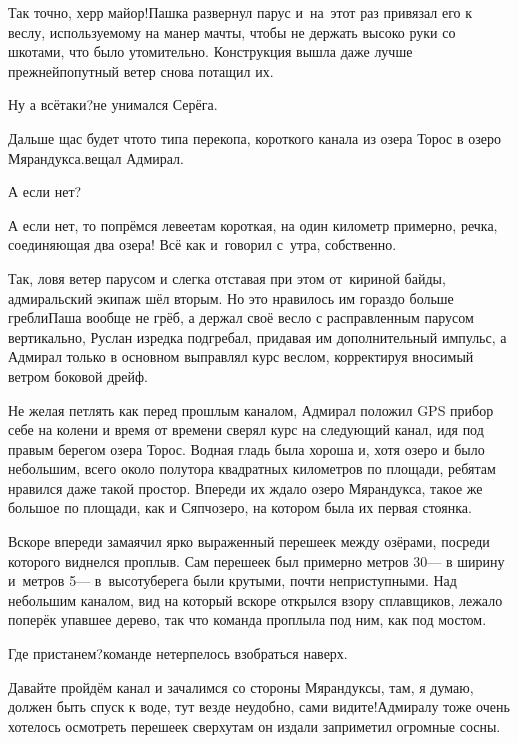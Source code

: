 \diagdash Так точно, херр майор!\mdash Пашка развернул парус и~на~этот раз привязал его к веслу, используемому на манер мачты, чтобы не держать высоко руки со шкотами, что было утомительно. Конструкция вышла даже лучше прежней\mdash попутный ветер снова потащил их. 

\diagdash Ну а всё\sdash таки?\mdash не унимался Серёга.

\diagdash Дальше щас будет что\sdash то типа перекопа, короткого канала из озера Торос в озеро Мярандукса.\mdash вещал Адмирал.

\diagdash А если нет?

\diagdash А если нет, то попрёмся левее\mdash там короткая, на один километр примерно, речка, соединяющая два озера! Всё как и~говорил с~утра, собственно.

Так, ловя ветер парусом и слегка отставая при этом от~кириной байды, адмиральский экипаж шёл вторым. Но это нравилось им гораздо больше гребли\mdash Паша вообще не грёб, а держал своё весло с расправленным парусом вертикально, Руслан изредка подгребал, придавая им дополнительный импульс, а Адмирал только в основном выправлял курс веслом, корректируя вносимый ветром боковой дрейф.

Не желая петлять как перед прошлым каналом, Адмирал положил GPS прибор себе на колени и время от времени сверял курс на следующий канал, идя под правым берегом озера Торос. Водная гладь была хороша и, хотя озеро и было небольшим, всего около полутора квадратных километров по площади, ребятам нравился даже такой простор. Впереди их ждало озеро Мярандукса, такое же большое по площади, как и Сяпчозеро, на котором была их первая стоянка. 

Вскоре впереди замаячил ярко выраженный перешеек между озёрами, посреди которого виднелся проплыв. Сам перешеек был примерно метров 30\thinspace\nobreakdash--- в ширину и~метров 5\thinspace\nobreakdash--- в~высоту\mdash берега были крутыми, почти неприступными. Над небольшим каналом, вид на который вскоре открылся взору сплавщиков, лежало поперёк упавшее дерево, так что команда проплыла под ним, как под мостом.

\diagdash Где пристанем?\mdash команде нетерпелось взобраться наверх.

\diagdash Давайте пройдём канал и зачалимся со стороны Мярандуксы, там, я думаю, должен быть спуск к воде, тут везде неудобно, сами видите!\mdash Адмиралу тоже очень хотелось осмотреть перешеек сверху\mdash там он издали заприметил огромные сосны.

